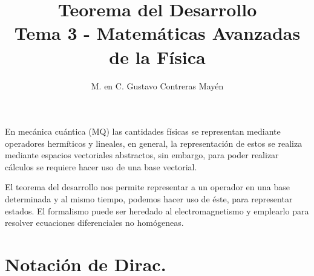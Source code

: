 
\title{Teorema del Desarrollo \\[0.3em]  \large{Tema 3 - Matemáticas Avanzadas de la Física}\vspace{-3ex}}
\author{M. en C. Gustavo Contreras Mayén}
\date{ }

\vspace{-4cm}
\maketitle
\fontsize{14}{14}\selectfont
En mecánica cuántica (MQ) las cantidades físicas se representan mediante operadores hermíticos y lineales, en general, la representación de estos se realiza mediante espacios vectoriales abstractos, sin embargo, para poder realizar cálculos se requiere hacer uso de una base vectorial.
\par
El teorema del desarrollo nos permite representar a un operador en una base determinada y al mismo tiempo, podemos hacer uso de éste, para representar estados. El formalismo puede ser heredado al electromagnetismo y emplearlo para resolver ecuaciones diferenciales no homógeneas.

\section{Notación de Dirac.}

